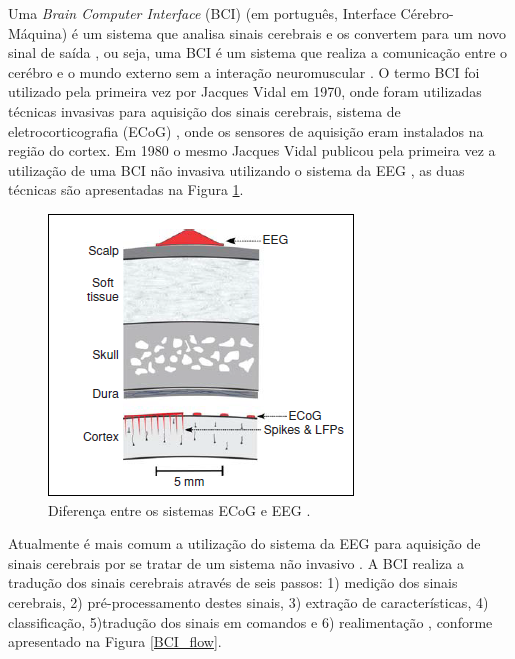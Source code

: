 Uma \textit{Brain Computer Interface} (BCI) (em português, Interface Cérebro-Máquina) é um sistema que analisa sinais cerebrais e os convertem para um novo sinal de saída \cite{BCIWolpaw}, ou seja, uma BCI é um sistema que realiza a comunicação entre o cerébro e o mundo externo sem a interação neuromuscular \cite{BCIWolpaw}.
O termo BCI foi utilizado pela primeira vez por Jacques Vidal em 1970, onde foram utilizadas técnicas invasivas para aquisição dos sinais cerebrais, sistema de eletrocorticografia (ECoG) \cite{BCIWolpaw}, onde os sensores de aquisição eram instalados na região do cortex. Em 1980 o mesmo Jacques Vidal publicou pela primeira vez a utilização de uma BCI não invasiva utilizando o sistema da EEG \cite{CristophBCI}, as duas técnicas são apresentadas na Figura \ref{ECoGeEEG}.
\pagebreak


\begin{figure}[h]
	\centering
	\includegraphics[keepaspectratio=true,scale=1.0]{figuras/sistemas_de_aquisicao.PNG}
	\caption{Diferença entre os sistemas ECoG e EEG \cite{BCIWolpaw}.}
	\label{ECoGeEEG}
\end{figure}

Atualmente é mais comum a utilização do sistema da EEG para aquisição de sinais cerebrais por se tratar de um sistema não invasivo \cite{CristophBCI}. A BCI realiza a tradução dos sinais cerebrais através de seis passos: 1) medição dos sinais cerebrais, 2) pré-processamento destes sinais, 3) extração de características, 4) classificação, 5)tradução dos sinais em comandos e 6) realimentação \cite{MasonAndBirch}, conforme apresentado na Figura \ref{BCI_flow}.

